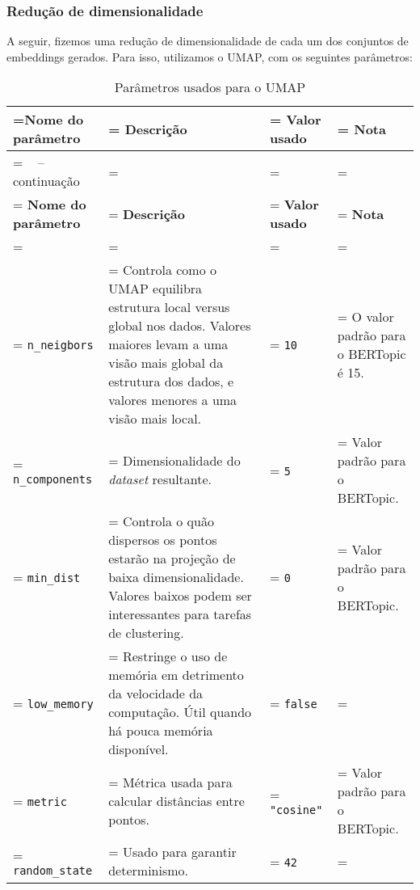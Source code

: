 \subsubsection{Redução de dimensionalidade}
A seguir, fizemos uma redução de dimensionalidade de cada um dos conjuntos de embeddings gerados.
Para isso, utilizamos o UMAP, com os seguintes parâmetros:

\begin{xltabular}{1\textwidth} {
    |>{\centering\arraybackslash{}\hsize\linewidth=\hsize}X
    |>{\centering\arraybackslash{}\hsize\linewidth=\hsize}X
    |>{\centering\arraybackslash{}\hsize\linewidth=\hsize}X
    |>{\centering\arraybackslash{}\hsize\linewidth=\hsize}X|
    }
\caption{Parâmetros usados para o UMAP} \label{tab:umap_params}\\
\hline \hline
\textbf{Nome do parâmetro} & \textbf{Descrição} & \textbf{Valor usado} & \textbf{Nota} \\
\hline \hline
\endfirsthead
{}%
{\tablename\ \thetable{} -- continuação} \\
\hline \hline
\textbf{Nome do parâmetro} & \textbf{Descrição} & \textbf{Valor usado} & \textbf{Nota} \\
\hline \hline
\endhead
\hline\hline {} \\ \hline \hline
\endfoot
\hline
\endlastfoot
\hline
\verb|n_neigbors| & Controla como o UMAP equilibra estrutura local versus global nos dados. Valores maiores levam a uma visão mais global da estrutura dos dados, e valores menores a uma visão mais local. & \verb|10| & O valor padrão para o BERTopic é 15. \\
\hline
\verb|n_components| & Dimensionalidade do \textit{dataset} resultante.  & \verb|5| & Valor padrão para o BERTopic. \\
\hline
\verb|min_dist| & Controla o quão dispersos os pontos estarão na projeção de baixa dimensionalidade. Valores baixos podem ser interessantes para tarefas de clustering. & \verb|0| & Valor padrão para o BERTopic. \\
\hline
\verb|low_memory| & Restringe o uso de memória em detrimento da velocidade da computação. Útil quando há pouca memória disponível. & \verb|false| &  \\
\hline
\verb|metric| & Métrica usada para calcular distâncias entre pontos. & \verb|"cosine"| & Valor padrão para o BERTopic. \\
\hline
\verb|random_state| & Usado para garantir determinismo. & \verb|42| &  \\
\hline \hline
\end{xltabular}

